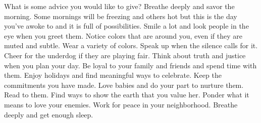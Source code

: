 What is some advice you would like to give?
Breathe deeply and savor the morning. Some mornings will be freezing and others hot but this is the day you've awoke to and it is full of possibilities. 
Smile a lot and look people in the eye when you greet them.
Notice colors that are around you, even if they are muted and subtle. Wear a variety of colors.
Speak up when the silence calls for it. Cheer for the underdog if they are playing fair. Think about truth and justice when you plan your day.
Be loyal to your family and friends and spend time with them.
Enjoy holidays and find meaningful ways to celebrate. 
Keep the commitments you have made.
Love babies and do your part to nurture them. Read to them.
Find ways to show the earth that you value her.
Ponder what it means to love your enemies. Work for peace in your neighborhood.
Breathe deeply and get enough sleep.






